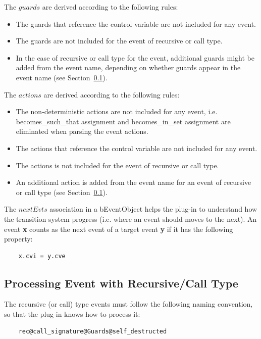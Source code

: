 \documentclass{easychair}
\begin{document}
The $guards$ are derived according to the following rules:
\begin{itemize}
	\item The guards that reference the control variable are not included for any event.
	\item The guards are not included for the event of recursive or call type.
	\item In the case of recursive or call type for the event, additional guards might be added from the event name, depending on whether guards appear in the event name (see Section~\ref{subsec:issue}).  
\end{itemize}

The $actions$ are derived according to the following rules:
\begin{itemize}
	\item The non-deterministic actions are not included for any event, i.e. becomes\_such\_that assignment and becomes\_in\_set assignment are eliminated when parsing the event actions.
	\item The actions that reference the control variable are not included for any event.
	\item The actions is not included for the event of recursive or call type.
	\item An additional action is added from the event name for an event of recursive or call type (see Section~\ref{subsec:issue}).  
\end{itemize}

The $nextEvts$ association in a bEventObject helps the plug-in to understand how the transition system progress (i.e. where an event should moves to the next). An event \textbf{x} counts as the next event of a target event \textbf{y} if it has the following property:
\begin{lstlisting}
	x.cvi = y.cve
\end{lstlisting}

\subsection{Processing Event with Recursive/Call Type}\label{subsec:issue}
The recursive (or call) type events must follow the following naming convention, so that the plug-in knows how to process it:

\lstset{language=[68]Algol}
\begin{lstlisting}
	rec@call_signature@Guards@self_destructed
\end{lstlisting}
\end{document}

